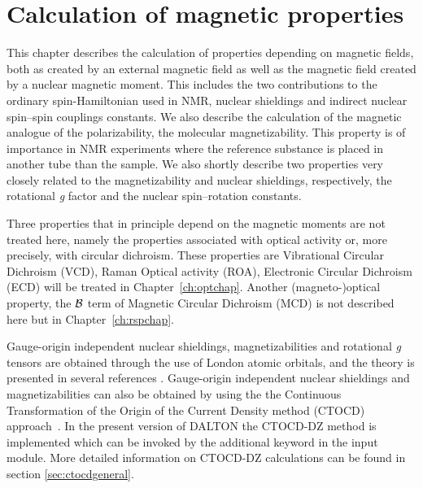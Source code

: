 \chapter{Calculation of magnetic properties}\label{ch:magnetic}

This chapter describes the calculation of properties depending on
magnetic fields, both as created by an external magnetic field as well
as the magnetic field created by a nuclear magnetic moment.
This includes the two
contributions to the ordinary spin-Hamiltonian used in NMR, nuclear
shieldings and indirect nuclear spin--spin
couplings constants. We
also describe the calculation of the magnetic analogue of the
polarizability, the molecular
magnetizability. This property
is of importance in NMR experiments where the reference substance is placed
in another tube than the sample. We also shortly
describe two properties very closely related to the magnetizability
and nuclear shieldings, respectively, the rotational {\em g} factor and the
nuclear spin--rotation constants.

Three properties that in principle depend on the %
magnetic moments are
not treated here, namely the properties associated with optical
activity or, more precisely, with circular dichroism. These
properties are Vibrational Circular Dichroism
(VCD), Raman
Optical activity (ROA),
Electronic Circular Dichroism (ECD) will be treated in Chapter~\ref{ch:optchap}.
Another (magneto-)optical property, the ${\cal{B}}$ term of
Magnetic Circular Dichroism (MCD) is not described here but in
Chapter~\ref{ch:rspchap}.

Gauge-origin independent nuclear shieldings,
magnetizabilities and rotational {\em g} tensors are
obtained through the use of London atomic orbitals, and the theory is
presented in several references
\cite{kwjfhppjacs112,krthrkpjklbhjajjcp100,krthklbpjhjajjcp99,krthklbpjjocp195}.
Gauge-origin independent nuclear shieldings and
magnetizabilities can also be obtained by using the 
the Continuous Transformation of the Origin of the Current Density method (CTOCD)
 approach~\cite{paololazz1,paololazz2,ctocd}. In the present version
of DALTON the CTOCD-DZ method is implemented which can be invoked by the additional 
keyword  in the  input module.  More detailed information
on CTOCD-DZ calculations can be found in section \ref{sec:ctocdgeneral}.


